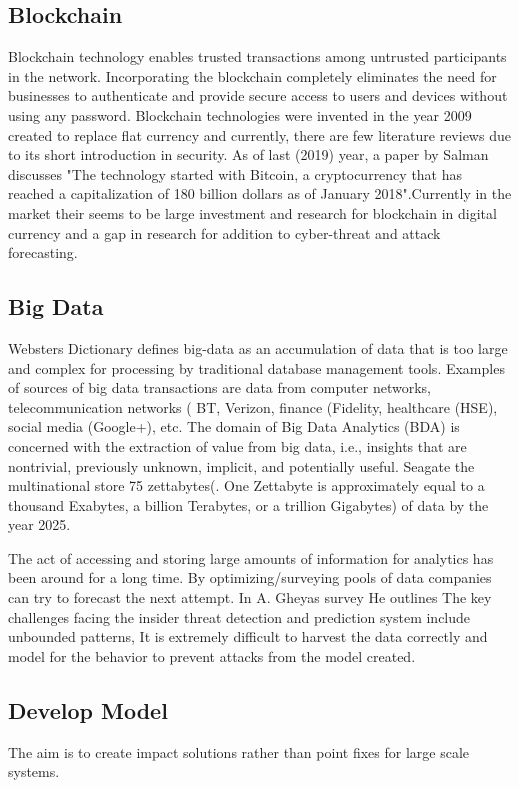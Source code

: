 \documentclass[journal]{IEEEtran}
\begin{document}
\subsection{Blockchain}\label{subsec:Blockchain}
Blockchain technology enables trusted transactions among untrusted participants in the network. Incorporating the blockchain completely eliminates the need for businesses to authenticate and provide secure access to users and devices without using any password. Blockchain technologies were invented in the year 2009 created to replace flat currency and currently, there are few literature reviews due to its short introduction in security. As of last (2019) year, a paper by Salman \cite{blockchainSurvey} discusses  "The technology
started with Bitcoin, a cryptocurrency that has reached a capitalization of 180 billion dollars as of January 2018".Currently in the market their seems to be large investment and research for blockchain in digital currency and a gap in research for addition to cyber-threat and attack forecasting.

 
\subsection{Big Data
}\label{subsec:BigData}
Websters Dictionary defines big-data as an accumulation of data that is too large and complex for processing by traditional database management tools. Examples of sources of big data
transactions are data from computer networks,
telecommunication networks ( BT, Verizon, finance (Fidelity, healthcare (HSE), social media (Google+), etc. The domain of Big Data Analytics (BDA) is concerned with the
extraction of value from big data, i.e., insights that are nontrivial, previously unknown, implicit, and potentially useful. Seagate the multinational store 75 zettabytes(. One Zettabyte is approximately equal to a thousand Exabytes, a billion Terabytes, or a trillion Gigabytes)  of data by the year 2025.



The act of accessing and storing large amounts of information for analytics has been around for a long time. By optimizing/surveying pools of data companies can try to forecast the next attempt. In A. Gheyas survey   \cite{surverydata}  He outlines The key challenges facing the insider threat detection and prediction system include unbounded patterns, It is extremely difficult to harvest the data correctly and model for the behavior to prevent attacks from the model created.


\subsection{Develop Model}
The aim is to create impact solutions rather than point fixes for large scale systems.
\end{document}
